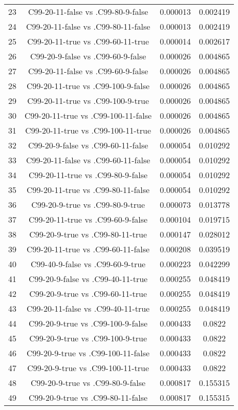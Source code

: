 \documentclass[a4paper,10pt]{article}
\begin{document}
\begin{landscape}
\begin{table}[!htp]
\begin{tabular}{cccc}
23&C99-20-11-false vs .C99-80-9-false&0.000013&0.002419\\
24&C99-20-11-false vs .C99-80-11-false&0.000013&0.002419\\
25&C99-20-11-true vs .C99-60-11-true&0.000014&0.002617\\
26&C99-20-9-false vs .C99-60-9-false&0.000026&0.004865\\
27&C99-20-11-false vs .C99-60-9-false&0.000026&0.004865\\
28&C99-20-11-true vs .C99-100-9-false&0.000026&0.004865\\
29&C99-20-11-true vs .C99-100-9-true&0.000026&0.004865\\
30&C99-20-11-true vs .C99-100-11-false&0.000026&0.004865\\
31&C99-20-11-true vs .C99-100-11-true&0.000026&0.004865\\
32&C99-20-9-false vs .C99-60-11-false&0.000054&0.010292\\
33&C99-20-11-false vs .C99-60-11-false&0.000054&0.010292\\
34&C99-20-11-true vs .C99-80-9-false&0.000054&0.010292\\
35&C99-20-11-true vs .C99-80-11-false&0.000054&0.010292\\
36&C99-20-9-true vs .C99-80-9-true&0.000073&0.013778\\
37&C99-20-11-true vs .C99-60-9-false&0.000104&0.019715\\
38&C99-20-9-true vs .C99-80-11-true&0.000147&0.028012\\
39&C99-20-11-true vs .C99-60-11-false&0.000208&0.039519\\
40&C99-40-9-false vs .C99-60-9-true&0.000223&0.042299\\
41&C99-20-9-false vs .C99-40-11-true&0.000255&0.048419\\
42&C99-20-9-true vs .C99-60-11-true&0.000255&0.048419\\
43&C99-20-11-false vs .C99-40-11-true&0.000255&0.048419\\
44&C99-20-9-true vs .C99-100-9-false&0.000433&0.0822\\
45&C99-20-9-true vs .C99-100-9-true&0.000433&0.0822\\
46&C99-20-9-true vs .C99-100-11-false&0.000433&0.0822\\
47&C99-20-9-true vs .C99-100-11-true&0.000433&0.0822\\
48&C99-20-9-true vs .C99-80-9-false&0.000817&0.155315\\
49&C99-20-9-true vs .C99-80-11-false&0.000817&0.155315\\

\end{tabular}
\end{table}
\end{landscape}
\end{document}
